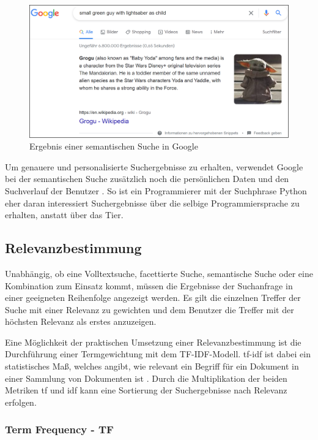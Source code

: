 \begin{figure}[H]
    \centering
    \includegraphics[width=1\linewidth]{images/baby_yoda.png}
    \caption{Ergebnis einer semantischen Suche in Google}
    \label{fig:baby_yoda_google}
\end{figure}

Um genauere und personalisierte Suchergebnisse zu erhalten, verwendet Google bei der semantischen Suche zusätzlich noch die persönlichen Daten und den Suchverlauf der Benutzer \cite{MichalPecanek.2020b}. So ist ein Programmierer mit der Suchphrase \glqq Python\grqq{} eher daran interessiert Suchergebnisse über die selbige Programmiersprache zu erhalten, anstatt über das Tier.

\subsection{Relevanzbestimmung\label{subsec2.1.5:Unterunterpunkt-5}}

Unabhängig, ob eine Volltextsuche, facettierte Suche, semantische Suche oder eine Kombination zum Einsatz kommt, müssen die Ergebnisse der Suchanfrage in einer geeigneten Reihenfolge angezeigt werden. Es gilt die einzelnen Treffer der Suche mit einer Relevanz zu gewichten und dem Benutzer die Treffer mit der höchsten Relevanz als erstes anzuzeigen.

Eine Möglichkeit der praktischen Umsetzung einer Relevanzbestimmung ist die Durchführung einer Termgewichtung mit dem \glqq TF-IDF\grqq{}-Modell. \glqq \gls{tf-idf}\grqq{} ist dabei ein statistisches Maß, welches angibt, wie relevant ein Begriff für ein Dokument in einer Sammlung von Dokumenten ist \cite{BrunoStecanella.2019}. Durch die Multiplikation der beiden Metriken \glqq \gls{tf}\grqq{} und \glqq \gls{idf}\grqq{} kann eine Sortierung der Suchergebnisse nach Relevanz erfolgen.

\subsubsection{Term Frequency - TF}

